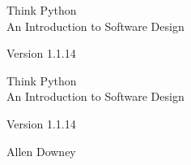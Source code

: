 \documentclass[10pt]{book}
\newcommand{\theversion}{1.1.14}
\begin{document}
\frontmatter




\newtheorem{ex}{Exercise}[chapter]

\begin{latexonly}

\renewcommand{\blankpage}{\thispagestyle{empty} \quad \newpage}



\thispagestyle{empty}

\begin{flushright}
\vspace*{2.0in}

\begin{spacing}{3}
{\huge Think Python}\\
{\Large An Introduction to Software Design}
\end{spacing}

\vspace{0.25in}

Version \theversion

\vfill

\end{flushright}


\blankpage
\blankpage

\pagebreak
\thispagestyle{empty}

\begin{flushright}
\vspace*{2.0in}

\begin{spacing}{3}
{\huge Think Python}\\
{\Large An Introduction to Software Design}
\end{spacing}

\vspace{0.25in}

Version \theversion

\vspace{1in}


{\Large
Allen Downey\\
}



\end{flushright}
\end{latexonly}
\end{document}
